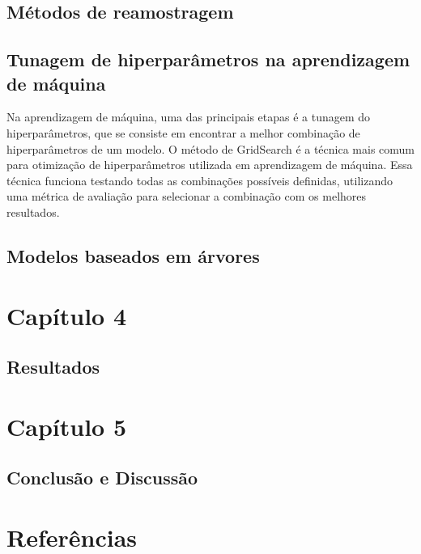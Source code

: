 \documentclass[
  letterpaper,
  DIV=11,
  numbers=noendperiod]{scrreprt}
\begin{document}
\section{Métodos de reamostragem}\label{muxe9todos-de-reamostragem}

\hfill\break

\section{Tunagem de hiperparâmetros na aprendizagem de
máquina}\label{tunagem-de-hiperparuxe2metros-na-aprendizagem-de-muxe1quina}

Na aprendizagem de máquina, uma das principais etapas é a tunagem do
hiperparâmetros, que se consiste em encontrar a melhor combinação de
hiperparâmetros de um modelo. O método de GridSearch é a técnica mais
comum para otimização de hiperparâmetros utilizada em aprendizagem de
máquina. Essa técnica funciona testando todas as combinações possíveis
definidas, utilizando uma métrica de avaliação para selecionar a
combinação com os melhores resultados.

\hfill\break

\section{Modelos baseados em
árvores}\label{modelos-baseados-em-uxe1rvores}

\newpage

\chapter{Capítulo 4}\label{capuxedtulo-4}

\section{Resultados}\label{resultados}

\newpage

\chapter{Capítulo 5}\label{capuxedtulo-5}

\section{Conclusão e Discussão}\label{conclusuxe3o-e-discussuxe3o}

\chapter{Referências}\label{referuxeancias}
\end{document}
